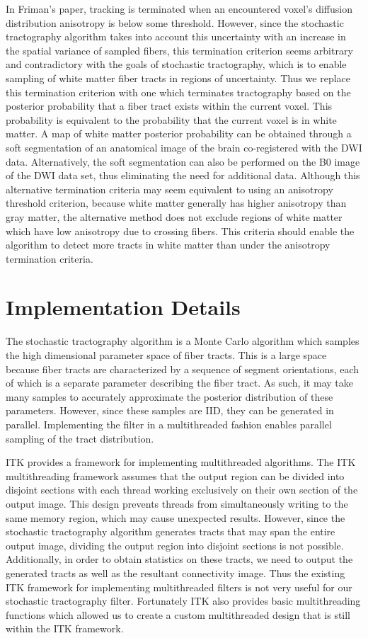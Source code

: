 \documentclass{InsightArticle}
\begin{document}
In Friman's paper, tracking is terminated when an encountered voxel's diffusion distribution anisotropy is below some threshold.  However, since the stochastic tractography algorithm takes into account this uncertainty with an increase in the spatial variance of sampled fibers, this termination criterion seems arbitrary and contradictory with the goals of stochastic tractography, which is to enable sampling of white matter fiber tracts in regions of uncertainty.  Thus we replace this termination criterion with one which terminates tractography based on the posterior probability that a fiber tract exists within the current voxel.  This probability is equivalent to the probability that the current voxel is in white matter.  A map of white matter posterior probability can be obtained through a soft segmentation of an anatomical image of the brain co-registered with the DWI data.  Alternatively, the soft segmentation can also be performed on the B0 image of the DWI data set, thus eliminating the need for additional data.  Although this alternative termination criteria may seem equivalent to using an anisotropy threshold criterion, because white matter generally has higher anisotropy than gray matter, the alternative method does not exclude regions of white matter which have low anisotropy due to crossing fibers.  This criteria should enable the algorithm to detect more tracts in white matter than under the anisotropy termination criteria.


\section{Implementation Details}

The stochastic tractography algorithm is a Monte Carlo algorithm which samples the high dimensional parameter space of fiber tracts.  This is a large space because fiber tracts are characterized by a sequence of segment orientations, each of which is a separate parameter describing the fiber tract.  As such, it may take many samples to accurately approximate the posterior distribution of these parameters.  However, since these samples are IID, they can be generated in parallel.  Implementing the filter in a multithreaded fashion enables parallel sampling of the tract distribution.

ITK provides a framework for implementing multithreaded algorithms.  The ITK multithreading framework assumes that the output region can be divided into disjoint sections with each thread working exclusively on their own section of the output image.  This design prevents threads from simultaneously writing to the same memory region, which may cause unexpected results.  However, since the stochastic tractography algorithm generates tracts that may span the entire output image, dividing the output region into disjoint sections is not possible.  Additionally, in order to obtain statistics on these tracts, we need to output the generated tracts as well as the resultant connectivity image.  Thus the existing ITK framework for implementing multithreaded filters is not very useful for our stochastic tractography filter.  Fortunately ITK also provides basic multithreading functions which allowed us to create a custom multithreaded design that is still within the ITK framework. 
\end{document}
